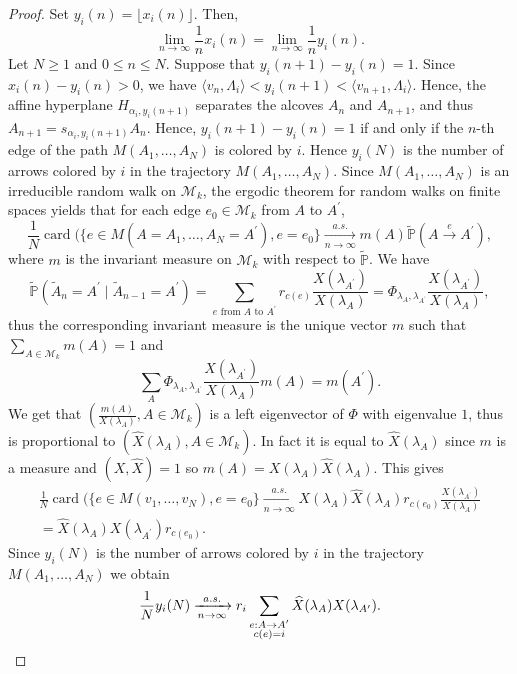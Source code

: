 \documentclass[ALCO,ThmDefs,Unicode,epreuves]{cedram}
\DeclareMathOperator{\card}{card}
\begin{document}
\begin{proof}
Set $y_{i}(n)=\lfloor x_{i}(n)\rfloor$. Then,
\[
\lim_{n\rightarrow\infty}\frac{1}{n}x_{i}(n)=\lim_{n\rightarrow\infty}\frac
{1}{n}y_{i}(n).
\]
Let $N\geq1$ and $0\leq n\leq N$. Suppose that $y_{i}(n+1)-y_{i}(n)=1$. Since
$x_{i}(n)-y_{i}(n)>0$, we have $\langle v_{n},\Lambda_{i}\rangle
<y_{i}(n+1)<\langle v_{n+1},\Lambda_{i}\rangle$. Hence, the affine hyperplane
$H_{\alpha_{i},y_{i}(n+1)}$ separates the alcoves $A_{n}$ and $A_{n+1}$, and
thus $A_{n+1}=s_{\alpha_{i},y_{i}(n+1)}A_{n}$. Hence, $y_{i}(n+1)-y_{i}(n)=1$
if and only if the $n$-th edge of the path $M(A_{1},\ldots,A_{N})$ is colored
by $i$. Hence $y_{i}(N)$ is the number of arrows colored by $i$ in the
trajectory $M(A_{1},\ldots,A_{N})$. Since $M(A_{1},\ldots,A_{N})$ is an
irreducible random walk on $\mathcal{M}_{k}$, the ergodic theorem for random
walks on finite spaces yields that for each edge $e_{0}\in\mathcal{M}_{k}$
from $A$ to $A^{\prime}$,
\[
\frac{1}{N}\card (\{e\in M(A=A_{1},\ldots,A_{N}=A^{\prime}%
),e=e_{0}\}\xrightarrow[n\rightarrow \infty]{a.s.}m(A)\widetilde{\mathbb{P}%
}(A\xrightarrow{e}A^{\prime}),
\]
where $m$ is the invariant measure on $\mathcal{M}_{k}$ with respect to
$\widetilde{\mathbb{P}}$. We have%
\[
\widetilde{\mathbb{P}}(\widetilde{A}_{n}=A^{\prime}\mid\widetilde{A}%
_{n-1}=A^{\prime})=\sum_{e\text{ from }A\text{ to }A^{\prime}}r_{c(e)}%
\frac{X(\lambda_{A^{\prime}})}{X(\lambda_{A})}=\Phi_{\lambda_{A}%
,\lambda_{A^{\prime}}}\frac{X(\lambda_{A^{\prime}})}{X(\lambda_{A})},
\]
thus the corresponding invariant measure is the unique vector $m$ such that
$\sum_{A\in\mathcal{M}_{k}}m(A)=1$ and
\[
\sum_{A}\Phi_{\lambda_{A},\lambda_{A^{\prime}}}\frac{X(\lambda_{A^{\prime}}%
)}{X(\lambda_{A})}m(A)=m(A^{\prime}).
\]
We get that $\left( \frac{m(A)}{X(\lambda_{A})},A\in\mathcal{M}_{k}\right) $
is a left eigenvector of $\Phi$ with eigenvalue $1$, thus is proportional to
$(\widehat{X}(\lambda_{A}),A\in\mathcal{M}_{k})$. In fact it is equal to
$\widehat{X}(\lambda_{A})$ since $m$ is a measure and $(X,\widehat{X})=1$ so
$m(A)=X(\lambda_{A})\widehat{X}(\lambda_{A}).$ This gives
\begin{multline*}
\frac{1}{N}\card (\{e\in M(v_{1},\ldots,v_{N}),e=e_{0}%
\}\xrightarrow[n\rightarrow \infty]{a.s.} X(\lambda_{A})\widehat{X}(\lambda
_{A})r_{c(e_{0})}\frac{X(\lambda_{A^{\prime}})}{X(\lambda_{A})}\\
=\widehat
{X}(\lambda_{A})X(\lambda_{A^{\prime}})r_{c(e_{0})}.
\end{multline*}
Since $y_{i}(N)$ is the number of arrows colored by $i$ in the trajectory
$M(A_{1},\ldots,A_{N})$ we obtain%
\[
\frac{1}{N}y_{i}(N)\xrightarrow[n\rightarrow \infty]{a.s.}r_{i}\sum
_{\substack{e:A\rightarrow A^{\prime}\\c(e)=i}}\widehat{X}(\lambda
_{A})X(\lambda_{A^{\prime}}).\qedhere
\]
\end{proof}
\end{document}
